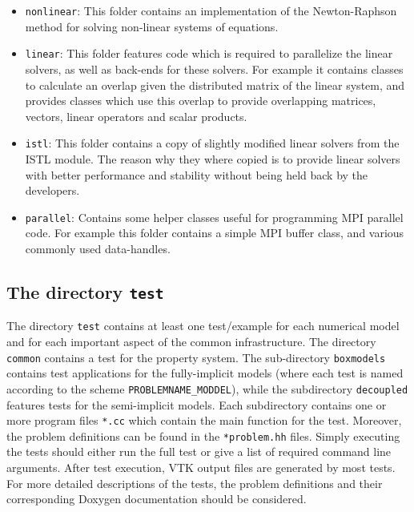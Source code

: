 \begin{itemize}
\item \texttt{nonlinear}: This folder contains an implementation of
  the Newton-Raphson method for solving non-linear systems of
  equations.

\item \texttt{linear}: This folder features code which is required to
  parallelize the linear solvers, as well as back-ends for these
  solvers. For example it contains classes to calculate an overlap
  given the distributed matrix of the linear system, and provides
  classes which use this overlap to provide overlapping matrices,
  vectors, linear operators and scalar products.

\item \texttt{istl}: This folder contains a copy of slightly modified
  linear solvers from the ISTL \Dune module. The reason why they where
  copied is to provide linear solvers with better performance and
  stability without being held back by the \Dune developers.

\item \texttt{parallel}: Contains some helper classes useful for
  programming MPI parallel code. For example this folder contains a
  simple MPI buffer class, and various commonly used \Dune
  data-handles.
\end{itemize}

\subsection{The directory \texttt{test}}\label{sec:test}

The directory \texttt{test} contains at least one test/example for
each numerical model and for each important aspect of the common
\eWoms infrastructure. The directory \texttt{common} contains a test
for the property system.  The sub-directory \texttt{boxmodels}
contains test applications for the fully-implicit models (where each
test is named according to the scheme \texttt{PROBLEMNAME\_MODDEL}),
while the subdirectory \texttt{decoupled} features tests for the
semi-implicit models.  Each subdirectory contains one or more program
files \texttt{*.cc} which contain the main function for the
test. Moreover, the problem definitions can be found in the
\texttt{*problem.hh} files. Simply executing the tests should either
run the full test or give a list of required command line
arguments. After test execution, VTK output files are generated by
most tests.  For more detailed descriptions of the tests, the problem
definitions and their corresponding Doxygen documentation should be
considered.

